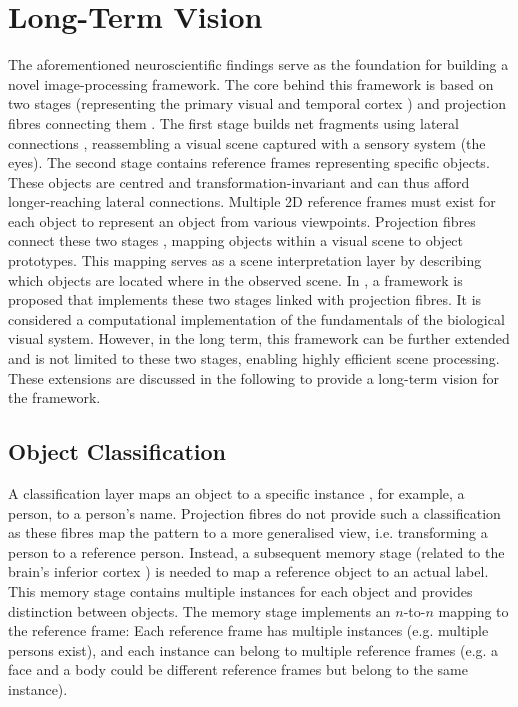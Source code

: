 \section{Long-Term Vision}
The aforementioned neuroscientific findings serve as the foundation for building a novel image-processing framework.
The core behind this framework is based on two stages (representing the primary visual  and temporal cortex ) and projection fibres connecting them .
The first stage builds net fragments  using lateral connections , reassembling a visual scene captured with a sensory system (the eyes).
The second stage contains reference frames representing specific objects. These objects are centred and transformation-invariant and can thus afford longer-reaching lateral connections.
Multiple 2D reference frames must exist for each object to represent an object from various viewpoints.
Projection fibres connect these two stages \cite{tanigawa_organization_2005, greig_molecular_2013}, mapping objects within a visual scene to object prototypes.
This mapping serves as a scene interpretation layer by describing which objects are located where in the observed scene.
In , a framework is proposed that implements these two stages linked with projection fibres.
It is considered a computational implementation of the fundamentals of the biological visual system.
However, in the long term, this framework can be further extended and is not limited to these two stages, enabling highly efficient scene processing.
These extensions are discussed in the following to provide a long-term vision for the framework.

\subsection{Object Classification}
A classification layer maps an object to a specific instance , for example, a person, to a person's name. Projection fibres do not provide such a classification as these fibres map the pattern to a more generalised view, i.e. transforming a person to a reference person. Instead, a subsequent memory stage (related to the brain's inferior cortex ) is needed to map a reference object to an actual label.
This memory stage contains multiple instances for each object and provides distinction between objects. The memory stage implements an $n$-to-$n$ mapping to the reference frame: Each reference frame has multiple instances (e.g. multiple persons exist), and each instance can belong to multiple reference frames (e.g. a face and a body could be different reference frames but belong to the same instance).

